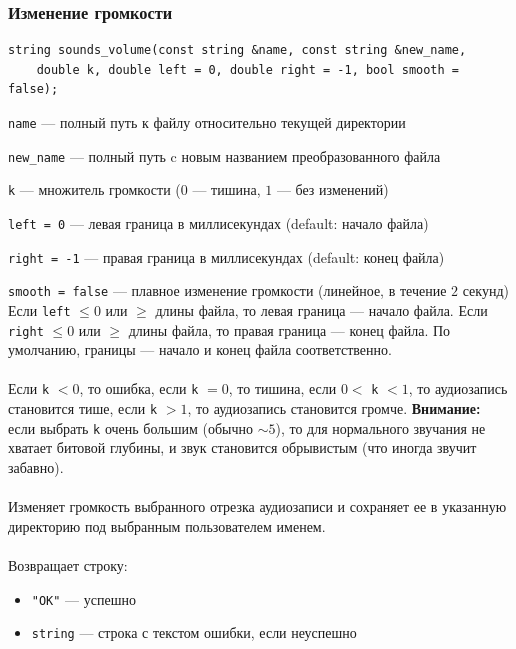 \documentclass[14pt,a4paper]{article}
\begin{document}
\subsubsection*{Изменение громкости}

\begin{lstlisting}
string sounds_volume(const string &name, const string &new_name, 
	double k, double left = 0, double right = -1, bool smooth = false);
\end{lstlisting}

\lstinline{name} --- полный путь к файлу относительно текущей директории \par
\lstinline{new_name} --- полный путь c новым названием преобразованного файла \par
\lstinline{k} --- множитель громкости ($0$ --- тишина, $1$ --- без изменений)\par
\lstinline{left = 0} --- левая граница в миллисекундах (default: начало файла) \par
\lstinline{right = -1} --- правая граница в миллисекундах (default: конец файла) \par
\lstinline{smooth = false} --- плавное изменение громкости (линейное, в течение $2$ секунд) \\

\noindent Если \lstinline{left} $\leq 0$ или $\geq$ длины файла, то левая граница --- начало файла. Если \lstinline{right} $\leq 0$ или $\geq$ длины файла, то правая граница --- конец файла. По умолчанию, границы --- начало и конец файла соответственно. \\\\
Если \lstinline{k} $< 0$, то ошибка, если \lstinline{k} $= 0$, то тишина, если $0 <$ \lstinline{k} $< 1$, то аудиозапись становится тише, если \lstinline{k} $> 1$, то аудиозапись становится громче. \textbf{Внимание:} если выбрать \lstinline{k} очень большим (обычно $\sim 5$), то для нормального звучания не хватает битовой глубины, и звук становится обрывистым (что иногда звучит забавно).\\\\
Изменяет громкость выбранного отрезка аудиозаписи и сохраняет ее в указанную директорию под выбранным пользователем именем. \\\\
Возвращает строку:
\smallskip
\begin{itemize}
\item \lstinline{"OK"} --- успешно
\item \lstinline{string} --- строка с текстом ошибки, если неуспешно
\end{itemize}
\end{document}
